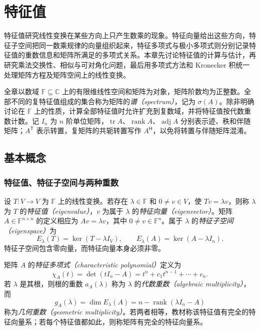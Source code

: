 \setcounter{chapter}{5} %
\chapter{特征值}
\label{chap:xie-ex-eig-eigenvalues}

特征值研究线性变换在某些方向上只产生数乘的现象。特征向量给出这些方向，特征子空间把同一数乘规律的向量组织起来，特征多项式与极小多项式则分别记录特征值的重数信息和矩阵所满足的多项式关系。本章先讨论特征值的计算与估计，再研究乘法交换性、相似与可对角化问题，最后用多项式方法和 Kronecker 积统一处理矩阵方程及矩阵空间上的线性变换。

全章以数域 $\mathbb F\subseteq\mathbb C$ 上的有限维线性空间和矩阵为对象，矩阵阶数均为正整数。全部不同的复特征值组成的集合称为矩阵的\emph{谱（spectrum）}，记为 $\sigma(A)$。除非明确讨论在 $\mathbb F$ 上的性质，计算全部特征值时允许扩充到复数域，并将特征值按代数重数计数。记 $I_n$ 为 $n$ 阶单位矩阵，$\operatorname{tr}A$、$\operatorname{rank}A$、$\operatorname{adj}A$ 分别表示迹、秩和伴随矩阵；$A^{\mathsf T}$ 表示转置，复矩阵的共轭转置写作 $A^{\mathsf H}$，以免将转置与伴随矩阵混淆。

\section{基本概念}
\label{sec:xie-ex-eig-eigen-basic}

\subsection{特征值、特征子空间与两种重数}

\begin{definition}
设 $T\colon V\to V$ 为 $\mathbb F$ 上的线性变换。若存在 $\lambda\in\mathbb F$ 和 $0\ne v\in V$，使 $Tv=\lambda v$，则称 $\lambda$ 为 $T$ 的\emph{特征值（eigenvalue）}，$v$ 为属于 $\lambda$ 的\emph{特征向量（eigenvector）}。矩阵 $A\in\mathbb F^{n\times n}$ 的定义相应为 $Av=\lambda v$，其中 $0\ne v\in\mathbb F^n$。属于 $\lambda$ 的\emph{特征子空间（eigenspace）}为
\[
E_\lambda(T)=\ker(T-\lambda I_V),\qquad
E_\lambda(A)=\ker(A-\lambda I_n).
\]
特征子空间包含零向量，而特征向量本身必须非零。
\end{definition}

\begin{definition}
矩阵 $A$ 的\emph{特征多项式（characteristic polynomial）}定义为
\begin{equation}
\chi_A(t)=\det(tI_n-A)=t^n+c_1t^{n-1}+\cdots+c_n.
\label{eq:xie-ex-eig-characteristic-polynomial}
\end{equation}
若 $\lambda$ 是其根，则根的重数 $a_A(\lambda)$ 称为 $\lambda$ 的\emph{代数重数（algebraic multiplicity）}，而
\[
g_A(\lambda)=\dim E_\lambda(A)=n-\operatorname{rank}(\lambda I_n-A)
\]
称为\emph{几何重数（geometric multiplicity）}。若两者相等，教材称该特征值有完全的特征向量系；若每个特征值都如此，则称矩阵有完全的特征向量系。
\end{definition}

